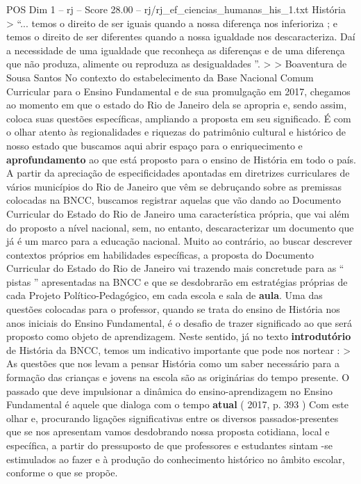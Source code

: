 \begin{textsample}{POS Dim 1 – rj – Score 28.00 – rj/rj\_ef\_ciencias\_humanas\_his\_1.txt}  \label{ex:f1_pos_280}
História > “... temos o direito de ser iguais quando a nossa diferença nos inferioriza ; e temos o direito de ser diferentes quando a nossa igualdade nos descaracteriza.
Daí a necessidade de uma igualdade que reconheça as diferenças e de uma diferença que não produza, alimente ou reproduza as desigualdades ”. > > Boaventura de Sousa Santos No contexto do estabelecimento da Base Nacional Comum Curricular para o Ensino Fundamental e de sua promulgação em 2017, chegamos ao momento em que o estado do Rio de Janeiro dela se apropria e, sendo assim, coloca suas questões específicas, ampliando a proposta em seu significado.
É com o olhar atento às regionalidades e riquezas do patrimônio cultural e histórico de nosso estado que buscamos aqui abrir espaço para o enriquecimento e \textbf{aprofundamento} ao que está proposto para o ensino de História em todo o país.
A partir da apreciação de especificidades apontadas em diretrizes curriculares de vários municípios do Rio de Janeiro que vêm se debruçando sobre as premissas colocadas na BNCC, buscamos registrar aquelas que vão dando ao Documento Curricular do Estado do Rio de Janeiro uma característica própria, que vai além do proposto a nível nacional, sem, no entanto, descaracterizar um documento que já é um marco para a educação nacional.
Muito ao contrário, ao buscar descrever contextos próprios em habilidades específicas, a proposta do Documento Curricular do Estado do Rio de Janeiro vai trazendo mais concretude para as “ pistas ” apresentadas na BNCC e que se desdobrarão em estratégias próprias de cada Projeto Político-Pedagógico, em cada escola e sala de \textbf{aula}.
Uma das questões colocadas para o professor, quando se trata do ensino de História nos anos iniciais do Ensino Fundamental, é o desafio de trazer significado ao que será proposto como objeto de aprendizagem.
Neste sentido, já no texto \textbf{introdutório} de História da BNCC, temos um indicativo importante que pode nos nortear : > As questões que nos levam a pensar História como um saber necessário para a formação das crianças e jovens na escola são as originárias do tempo presente.
O passado que deve impulsionar a dinâmica do ensino-aprendizagem no Ensino Fundamental é aquele que dialoga com o tempo \textbf{atual} ( 2017, p. 393 ) Com este olhar e, procurando ligações significativas entre os diversos passados-presentes que se nos apresentam vamos desdobrando nossa proposta cotidiana, local e específica, a partir do pressuposto de que professores e estudantes sintam -se estimulados ao fazer e à produção do conhecimento histórico no âmbito escolar, conforme o que se propõe.

\end{textsample}
